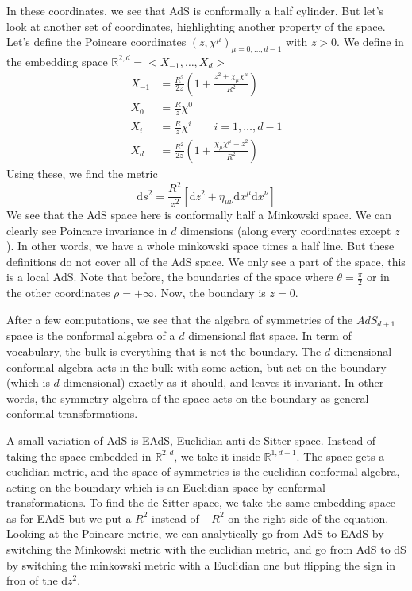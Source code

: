 \documentclass[a4paper]{book}
\theoremstyle{definition}
\theoremstyle{remark}
\begin{document}
In these coordinates, we see that AdS is conformally a half cylinder. But let's look at another set of coordinates, highlighting another property of the space. Let's define the Poincare coordinates $(z, \chi^\mu)_{\mu = 0, \dots, d-1}$ with $z>0$. We define in the embedding space $\mathbb{R}^{2,d} = <X_{-1}, \dots, X_d>$
\begin{equation}
   \begin{aligned}
    X_{-1} &= \frac{R^2}{2z}(1 + \frac{z^2 + \chi_\mu \chi^\mu}{R^2})  \\
    X_0 &= \frac{R}{z} \chi^0 \\ 
    X_i &= \frac{R}{z} \chi^i \qquad i = 1, \dots, d-1 \\
    X_d &= \frac{R^2}{2z}(1 + \frac{\chi_\mu \chi^\mu - z^2}{R^2})
   \end{aligned}
\end{equation}
Using these, we find the metric 
\begin{equation}
    \text{d}s^2 = \frac{R^2}{z^2}\left[\text{d}z^2 + \eta_{\mu\nu}\text{d}x^\mu \text{d}x^\nu\right]
\end{equation}
We see that the AdS space here is conformally half a Minkowski space. We can clearly see Poincare invariance in $d$ dimensions (along every coordinates except $z$). In other words, we have a whole minkowski space times a half line. But these definitions do not cover all of the AdS space. We only see a part of the space, this is a local AdS. Note that before, the boundaries of the space where $\theta = \frac{\pi}{2}$ or in the other coordinates $\rho = + \infty$. Now, the boundary is $z = 0$. \par \medskip 

After a few computations, we see that the algebra of symmetries of the $AdS_{d+1}$ space is the conformal algebra of a $d$ dimensional flat space. In term of vocabulary, the bulk is everything that is not the boundary. The $d$ dimensional conformal algebra acts in the bulk with some action, but act on the boundary (which is $d$ dimensional) exactly as it should, and leaves it invariant. In other words, the symmetry algebra of the space acts on the boundary as general conformal transformations. \par \medskip 

A small variation of AdS is EAdS, Euclidian anti de Sitter space. Instead of taking the space embedded in $\mathbb{R}^{2,d}$, we take it inside $\mathbb{R}^{1,d+1}$. The space gets a euclidian metric, and the space of symmetries is the euclidian conformal algebra, acting on the boundary which is an Euclidian space by conformal transformations. To find the de Sitter space, we take the same embedding space as for EAdS but we put a $R^2$ instead of $-R^2$ on the right side of the equation. Looking at the Poincare metric, we can analytically go from AdS to EAdS by switching the Minkowski metric with the euclidian metric, and go from AdS to dS by switching the minkowski metric with a Euclidian one but flipping the sign in fron of the $\text{d}z^2$. \par \medskip 
\end{document}
